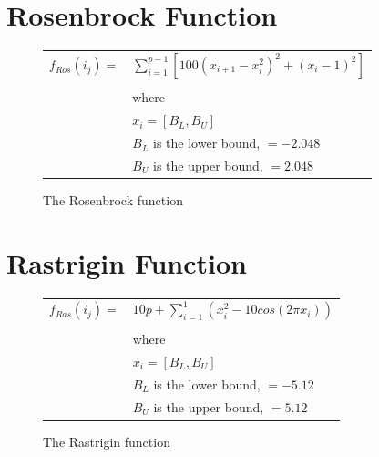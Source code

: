 \documentclass[12pt]{article}
\begin{document}
\pagebreak

\section{Rosenbrock Function}
\begin{figure}[!h]
        \begin{center}
		\begin{tabular}{r l}
			$ f_{Ros}(i_j) = $		&	$ \sum_{i=1}^{p-1} [100 (x_{i+1} - x_{i}^{2})^2 + (x_i - 1)^2] $ \\
								& \\
								&	where \\
								&	$ x_i = [B_L, B_U] $ \\
								& 	$ B_L $ is the lower bound, $ = -2.048 $\\
								& 	$ B_U $ is the upper bound, $ = 2.048 $\\

		\end{tabular} 
               \caption{The Rosenbrock function}
                \label{rosenbrock}
        \end{center}
\end{figure}

\section{Rastrigin Function}
\begin{figure}[!h]
        \begin{center}
		\begin{tabular}{r l}
			$ f_{Ras}(i_j) = $		&	$ 10p + \sum_{i=1}^{1} (x_i^2 - 10 cos(2\pi x_i) )$ \\
								& \\
								&	where \\
								&	$ x_i = [B_L, B_U] $ \\
								& 	$ B_L $ is the lower bound, $ = -5.12 $\\
								& 	$ B_U $ is the upper bound, $ = 5.12 $\\

		\end{tabular} 
               \caption{The Rastrigin function}
                \label{rastrigin}
        \end{center}
\end{figure}

\pagebreak
\end{document}
